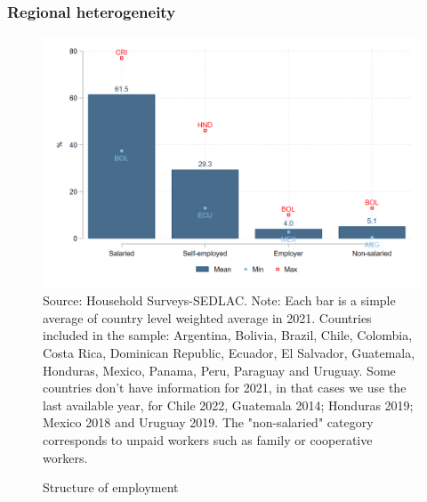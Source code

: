 \documentclass{beamer}
\begin{document}
\begin{frame}
\frametitle{Regional heterogeneity}
 \begin{figure}[!htb]
        \justifying
        \caption{Structure of employment}     
        \includegraphics[scale=.2]{latex/figures/Snapshot/Structure of employment.png}
        \label{fig:employment}
        \footnotesize{Source: Household Surveys-SEDLAC.}
        \footnotesize{Note: Each bar is a simple average of country level weighted average in 2021. Countries included in the sample: Argentina, Bolivia, Brazil, Chile, Colombia, Costa Rica, Dominican Republic, Ecuador, El Salvador, Guatemala, Honduras, Mexico, Panama, Peru, Paraguay and Uruguay. Some countries don’t have information for 2021, in that cases we use the last available year, for Chile 2022, Guatemala 2014; Honduras 2019; Mexico 2018 and Uruguay 2019. The "non-salaried" category corresponds to unpaid workers such as family or cooperative workers.}
\end{figure}
\end{frame}
     
\end{document}
